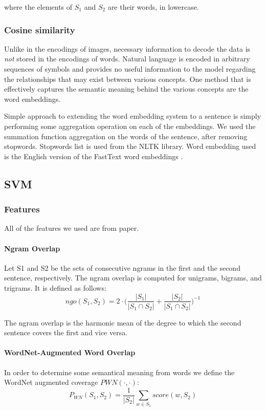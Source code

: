 \documentclass[10pt, a4paper]{article}
\begin{document}
\begin{table}[h!]
where the elements of $S_1$ and $S_2$ are their words, in lowercase.

\subsubsection{Cosine similarity}

Unlike in the encodings of images, necessary information to decode the data is \textit{not} stored in the encodings of words.
Natural language is encoded in arbitrary sequences of symbols and provides no useful information to the model regarding the relationships that may exist between various concepts.
One method that is effectively captures the semantic meaning behind the various concepts are the word embeddings.

Simple approach to extending the word embedding system to a sentence is simply performing some aggregation operation on each of the embeddings.
We used the summation function aggregation on the words of the sentence, after removing stopwords.
Stopwords list is used from the NLTK library.
Word embedding used is the English version of the FastText word embeddings \citep{joulin2016fasttext}.

\subsection{SVM}

\subsubsection{Features}
All of the features we used are from \citep{Saric2012TakeLabSF} paper.
\paragraph{Ngram Overlap \\}
Let S1 and S2 be the sets of consecutive ngrams in the first and the second sentence, respectively. The ngram overlap is computed for unigrams, bigrams, and trigrams. It is defined as follows:
\begin{equation}\label{eq:ngo}
ngo(S_1, S_2) = 2 \cdot \bigg( \frac{|S_1|}{|S_1 \cap S_2|}+\frac{|S_2|}{|S_1 \cap S_2|}\bigg)^{-1}
\end{equation}

The ngram overlap is the harmonic mean of the degree
to which the second sentence covers the first
and vice versa.\citep{Saric2012TakeLabSF}

\paragraph{WordNet-Augmented Word Overlap \\}
In order to determine some semantical meaning from words we define the WordNet augmented coverage $ PWN(\cdot, \cdot) $:
\begin{equation}\label{eq:pwn}
P_{WN}(S_1, S_2) = \frac{1}{|S_2|} \sum_{w \in S_1} score(w, S_2)
\end{equation}


\end{table}
\end{document}
